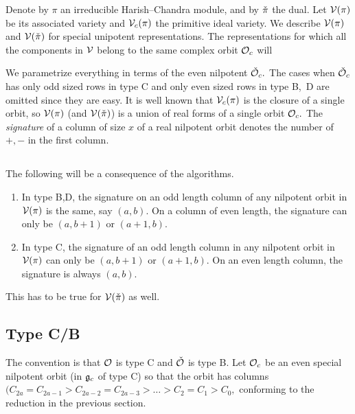 \documentclass[11pt ,reqno]{amsart}
\begin{document}
Denote by $\pi$ an irreducible Harish--Chandra module, and by ${\check\pi}$ the
dual. Let ${\mathcal V}(\pi)$ be its associated variety and ${\mathcal V_c}(\pi)$ the primitive ideal variety. We describe ${\mathcal V}(\pi)$ and ${\mathcal V}({\check\pi})$ for
special unipotent representations.
The representations for which all
the components in ${\mathcal V}$ belong to the same complex orbit ${\mathcal O}_c$ will 


\medskip
We parametrize everything in terms of the even
nilpotent ${\check {\mathcal O}_c}.$ The cases when ${\check {\mathcal O}_c}$ has only odd sized rows in
type C and only even sized rows in type B,\ D are omitted since they
are easy. It is well known that ${\mathcal V_c}(\pi)$ is the closure of a single
orbit, so ${\mathcal V}(\pi)$ (and ${\mathcal V}({\check\pi})$) is a union of real forms of a
single orbit $\mathcal O_c.$ The {\it signature} of a column of size $x$ of a
real nilpotent orbit denotes the number of $+,-$ in the first column. 

\subsection{}\label{sec:3.1} The following will be a consequence of the
algorithms. 
\begin{enumerate}
\item In type B,D, the signature on an odd length column of any
  nilpotent orbit in  ${\mathcal V}(\pi)$ is the
  same, say  $(a,b).$  On a column of even length, the signature can
  only be $(a,b+1)$ or $(a+1,b).$ 
\item In type C, the signature of an odd length column in any
  nilpotent orbit in ${\mathcal V}(\pi)$ can only be $(a,b+1)$ or $(a+1,b).$
  On an even length column, the signature is always $(a,b).$ 
\end{enumerate}
This has to be true for ${\mathcal V}({\check\pi})$ as well.

\subsection{Type  C/B}\label{3.2} The convention is that $\mathcal O$ is type
C and ${\check {\mathcal O}}$ is type B. Let $\mathcal O_c$ be an even special nilpotent orbit (in
${\mathfrak g}_c$ of type C) so that the orbit has columns $(C_{2a}=C_{2a-1}> C_{2a-2}=C_{2a-3}> \dots >C_2= C_{1}>C_0,$  conforming to the reduction in the previous section. 
\end{document}
